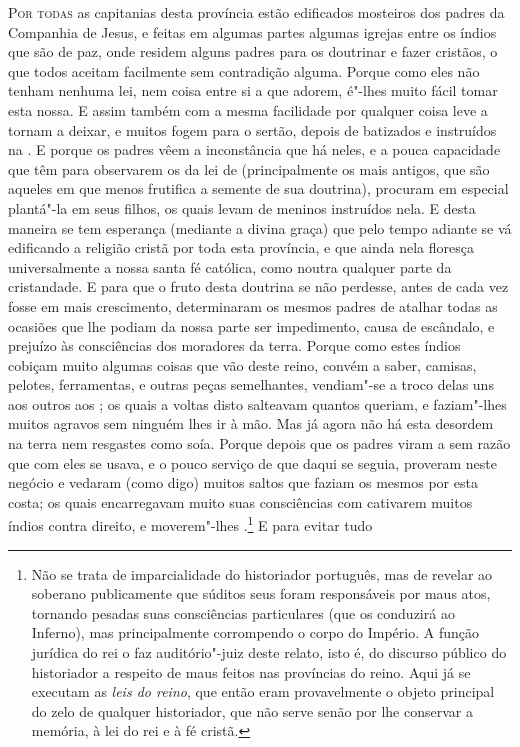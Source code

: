 \noindent\textsc{Por todas} as capitanias desta província estão edificados mosteiros dos
padres da Companhia de Jesus, e feitas em algumas partes algumas igrejas
entre os índios que são de paz, onde residem alguns padres para os			%
doutrinar e fazer cristãos, o que todos aceitam facilmente sem				%
contradição alguma. Porque como eles não tenham nenhuma lei, nem coisa			%
entre si a que adorem, é"-lhes muito fácil tomar esta nossa. E assim			%
também com a mesma facilidade por qualquer coisa leve a tornam a
deixar, e muitos fogem para o sertão, depois de batizados e instruídos
na . E porque os padres vêem a inconstância que há
neles, e a pouca capacidade que têm para observarem os  da
lei de  (principalmente os mais antigos, que são aqueles em que
menos frutifica a semente de sua doutrina), procuram em especial
plantá"-la em seus filhos, os quais levam de meninos instruídos nela. E
desta maneira se tem esperança (mediante a divina graça) que pelo tempo
adiante se vá edificando a religião cristã por toda esta província, e
que ainda nela floresça universalmente a nossa santa fé católica, como
noutra qualquer parte da cristandade. E para que o fruto desta
doutrina se não perdesse, antes de cada vez fosse em mais crescimento,
determinaram os mesmos padres de atalhar todas as ocasiões que lhe
podiam da nossa parte ser impedimento, causa de escândalo, e prejuízo
às consciências dos moradores da terra. Porque como estes índios		%
cobiçam muito algumas coisas que vão deste reino, convém a saber,
camisas, pelotes, ferramentas, e outras peças semelhantes, vendiam"-se a	%
troco delas uns aos outros aos ; os quais a voltas disto
salteavam quantos queriam, e faziam"-lhes muitos agravos sem ninguém
lhes ir à mão. Mas já agora não há esta desordem na terra nem resgastes
como soía. Porque depois que os padres viram a sem razão que com eles
se usava, e o pouco serviço de  que daqui se seguia, proveram neste
negócio e vedaram (como digo) muitos saltos que faziam os mesmos
 por esta costa; os quais encarregavam muito suas
consciências com cativarem muitos índios contra direito, e moverem"-lhes
.\footnote{ Não se trata de imparcialidade do
historiador português, mas de revelar ao soberano publicamente que
súditos seus foram responsáveis por maus atos, tornando pesadas suas
consciências particulares (que os conduzirá ao Inferno), mas
principalmente corrompendo o corpo do Império. A função jurídica do rei
o faz auditório"-juiz deste relato, isto é, do discurso público do
historiador a respeito de maus feitos nas províncias do reino. Aqui já
se executam as \textit{leis do reino}, que então eram provavelmente o
objeto principal do zelo de qualquer historiador, que não serve senão
por lhe conservar a memória, à lei do rei e à fé cristã.} E para evitar tudo
